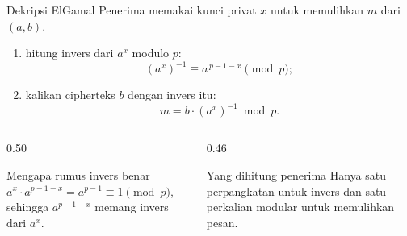 \documentclass[aspectratio=169,11pt]{beamer}
\begin{document}
\begin{frame}{Dekripsi ElGamal}
    \footnotesize
    Penerima memakai kunci privat $x$ untuk memulihkan $m$ dari $(a,b)$.
    \begin{enumerate}
        \item hitung invers dari $a^{x}$ modulo $p$:
              \[
                  (a^{x})^{-1} \equiv a^{\,p-1-x} \pmod p ;
              \]
        \item kalikan cipherteks $b$ dengan invers itu:
              \[
                  m = b \cdot (a^{x})^{-1} \bmod p .
              \]
    \end{enumerate}
    \vspace{0.1cm}
    \begin{columns}[T,onlytextwidth]
        \begin{column}{0.50\textwidth}
            \begin{block}{Mengapa rumus invers benar}
                \footnotesize
                $a^{x} \cdot a^{p-1-x} = a^{p-1} \equiv 1 \pmod p$,
                sehingga $a^{p-1-x}$ memang invers dari $a^{x}$.
            \end{block}
        \end{column}
        \begin{column}{0.46\textwidth}
            \begin{exampleblock}{Yang dihitung penerima}
                \footnotesize
                Hanya satu perpangkatan untuk invers dan satu perkalian
                modular untuk memulihkan pesan.
            \end{exampleblock}
        \end{column}
    \end{columns}
\end{frame}
\end{document}
